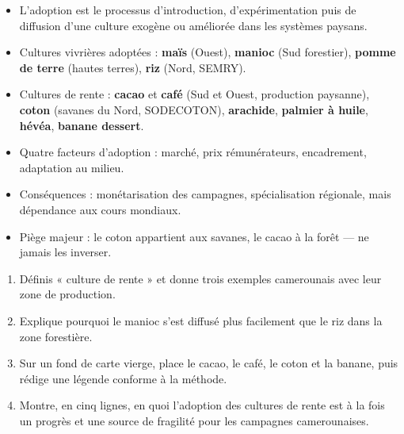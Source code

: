 \documentclass[11pt]{article}
\newcommand{\cle}[1]{{\popxbold\color{popdark}#1}}
\begin{document}
\begin{aretenir}
\begin{itemize}
\item L'\cle{adoption} est le processus d'introduction, d'expérimentation puis de diffusion d'une culture exogène ou améliorée dans les systèmes paysans.
\item Cultures vivrières adoptées : \textbf{maïs} (Ouest), \textbf{manioc} (Sud forestier), \textbf{pomme de terre} (hautes terres), \textbf{riz} (Nord, SEMRY).
\item Cultures de rente : \textbf{cacao} et \textbf{café} (Sud et Ouest, production paysanne), \textbf{coton} (savanes du Nord, SODECOTON), \textbf{arachide}, \textbf{palmier à huile}, \textbf{hévéa}, \textbf{banane dessert}.
\item Quatre facteurs d'adoption : marché, prix rémunérateurs, encadrement, adaptation au milieu.
\item Conséquences : monétarisation des campagnes, spécialisation régionale, mais dépendance aux cours mondiaux.
\item Piège majeur : le coton appartient aux savanes, le cacao à la forêt — ne jamais les inverser.
\end{itemize}
\end{aretenir}

\begin{exercice}
\begin{enumerate}
\item Définis « culture de rente » et donne trois exemples camerounais avec leur zone de production.
\item Explique pourquoi le manioc s'est diffusé plus facilement que le riz dans la zone forestière.
\item Sur un fond de carte vierge, place le cacao, le café, le coton et la banane, puis rédige une légende conforme à la méthode.
\item Montre, en cinq lignes, en quoi l'adoption des cultures de rente est à la fois un progrès et une source de fragilité pour les campagnes camerounaises.
\end{enumerate}
\end{exercice}
\end{document}
